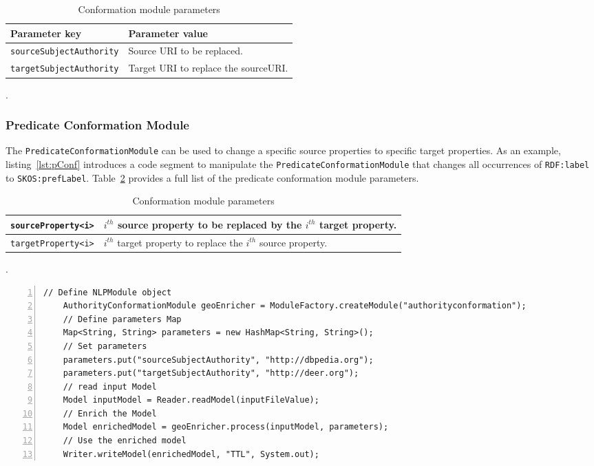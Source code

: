\documentclass[a4paper,twoside,bibtotoc,abstracton,12pt,BCOR=15mm]{article}
\begin{document}
    \begin{table}
      \caption{Conformation module parameters} \label{tbl:aConf}
      \small
	\begin{tabularx}{\textwidth}{@{}lX@{}}
	    \toprule
	    \textbf{Parameter key} 	& \textbf{Parameter value} \\
	    \toprule
	    \texttt{sourceSubjectAuthority}	& Source URI to be replaced.\\
	    \midrule
	    \texttt{targetSubjectAuthority}	& Target URI to replace the sourceURI.\\
	    \bottomrule
	\end{tabularx}
    \end{table}.
    
\subsubsection{Predicate Conformation Module}
    The \texttt{PredicateConformationModule} can be used to change a specific source properties to specific target properties.
    As an example, listing~\ref{lst:pConf} introduces a code segment to manipulate the \texttt{PredicateConformationModule} that changes all occurrences of \texttt{RDF:label} to \texttt{SKOS:prefLabel}.
    Table~\ref{tbl:pConf} provides a full list of the predicate conformation module parameters.
    

    \begin{table}
    \caption{Conformation module parameters} \label{tbl:pConf}
    \small
    \begin{tabularx}{\textwidth}{@{}lX@{}}
    \toprule
    \texttt{sourceProperty<i>}	& $i^{th}$ source property to be replaced by the $i^{th}$ target property.\\
    \midrule
    \texttt{targetProperty<i>}	& $i^{th}$ target property to replace the $i^{th}$ source property.\\
    \bottomrule
    \end{tabularx}
    \end{table}.
    
    \begin{lstlisting}[label=lst:aConf, float=tp, numbers=left, numberstyle=\tiny, caption = Code fragment to call the \texttt{AuthorityConformationModule} class.]
    // Define NLPModule object
    AuthorityConformationModule geoEnricher = ModuleFactory.createModule("authorityconformation");
    // Define parameters Map
    Map<String, String> parameters = new HashMap<String, String>();
    // Set parameters
    parameters.put("sourceSubjectAuthority", "http://dbpedia.org");
    parameters.put("targetSubjectAuthority", "http://deer.org");
    // read input Model
    Model inputModel = Reader.readModel(inputFileValue);
    // Enrich the Model
    Model enrichedModel = geoEnricher.process(inputModel, parameters);
    // Use the enriched model
    Writer.writeModel(enrichedModel, "TTL", System.out);
    \end{lstlisting}
    
\end{document}
